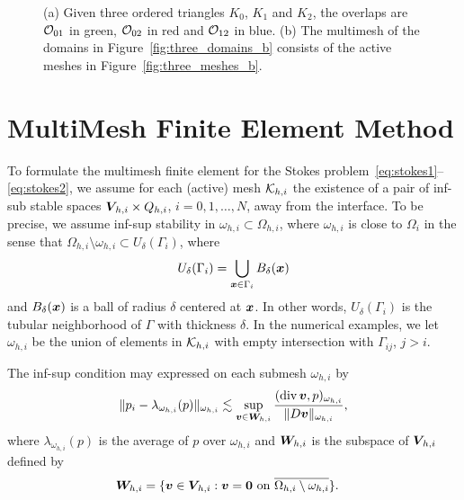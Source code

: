 \documentclass[graybox]{svmult}
\begin{document}
\begin{figure}
  \centering
  \qquad\qquad\qquad
  \caption{(a) Given three ordered triangles $K_0$, $K_1$ and $K_2$, the overlaps are $\mathcal{O}_{01}$ in green, $\mathcal{O}_{02}$ in red and $\mathcal{O}_{12}$ in blue. (b) The multimesh of the domains in Figure~\ref{fig:three_domains_b} consists of the active meshes in Figure~\ref{fig:three_meshes_b}.}
\end{figure}

\section{MultiMesh Finite Element Method}

To formulate the multimesh finite element for the Stokes problem~\eqref{eq:stokes1}--\eqref{eq:stokes2}, we assume for each (active) mesh $\mathcal{K}_{h,i}$ the existence of a pair of inf-sub stable spaces $\bm{V\!}_{h,i}\times Q_{h,i}$, $i=0,1, \ldots, N$, away from the interface. To be precise, we assume inf-sup stability in $\omega_{h,i} \subset \Omega_{h,i}$, where $\omega_{h,i}$ is close to $\Omega_i$ in the sense that $\Omega_{h,i} \setminus \omega_{h,i} \subset U_\delta(\Gamma_i)$, where
\begin{align}
  U_\delta(\Gamma_i) = \bigcup_{\bm{x} \in \Gamma_i} B_\delta(\bm{x})
\end{align}
and $B_\delta(\bm{x})$ is a ball of radius $\delta$ centered at $\bm{x}$. In other words, $U_\delta(\Gamma_i)$ is the tubular neighborhood of $\Gamma$ with thickness $\delta$. In the numerical examples, we let $\omega_{h,i}$ be the union of elements in $\mathcal{K}_{h,i}$ with empty intersection with $\Gamma_{ij}$, $j > i$.

The inf-sup condition may expressed on each submesh $\omega_{h,i}$ by
\begin{align}
  \label{assum:infsup}
  \| p_i - \lambda_{\omega_{h,i}}(p) \|_{\omega_{h,i}}
  \lesssim
  \sup_{\bm{v} \in \bm{W\!}_{h,i}} \frac{(\operatorname*{div} \bm{v},p)_{\omega_{h,i}}}{\|D \bm{v} \|_{\omega_{h,i}}},
\end{align}
where $\lambda_{\omega_{h,i}}(p)$ is the average of $p$ over $\omega_{h,i}$ and $\bm{W\!}_{h,i}$ is the subspace of $\bm{V\!}_{h,i}$ defined by
\begin{align}
  \label{eq:bfW}
  \bm{W\!}_{h,i}
  &=
  \{\bm{v} \in \bm{V\!}_{h,i}: \text{$\bm{v}=\bm{0}$ \text{on} $\overline{\Omega_{h,i} \setminus \omega_{h,i}}$}\}.
\end{align}
\end{document}

